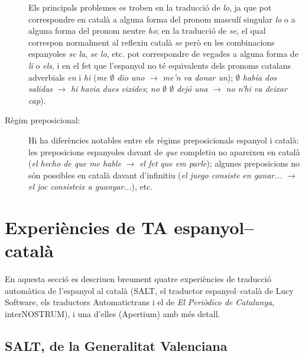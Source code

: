 \begin{description}
Els principals problemes es troben en la traducció de \emph{lo}, ja que
pot correspondre 
en català a alguna forma del pronom masculí singular {\em
  lo} o a alguna forma del
pronom neutre \emph{ho}; en la traducció de 
\emph{se}, el qual correspon normalment al reflexiu 
català \emph{se} però
en les combinacions espanyoles \emph{se la}, \emph{se lo}, etc. pot
correspondre de vegades a alguna forma de \emph{li} o \emph{els}, i en
el fet que l'espanyol no té equivalents dels pronoms catalans
adverbials \emph{en} i \emph{hi}  (\emph{me $\emptyset$ dio uno}
$\rightarrow$
\emph{me'n va donar un}); \emph{$\emptyset$ había dos salidas}
$\rightarrow$ \emph{hi havia dues eixides}; \emph{no $\emptyset$
  $\emptyset$ dejó una} $\rightarrow$ \emph{no n'hi va deixar cap}).
\item[Règim preposicional:] Hi ha diferències notables entre
  els règims preposicionals espanyol i català: les
  preposicions espanyoles davant de \emph{que} completiu no apareixen
  en català (\emph{el hecho de que me hable} $\rightarrow$ \emph{el
    fet que em parle}); algunes preposicions no són possibles en català
  davant d'infinitiu (\emph{el juego consiste en ganar...}
  $\rightarrow$ \emph{el joc consisteix a guanyar...}), etc.
\end{description}

\section{Experiències de TA espanyol--català}
\label{se:ETACC}

En aquesta secció es descriuen breument quatre experiències de
traducció automàtica de l'espanyol al català (SALT, el traductor
espanyol--català de Lucy Software, els traductors Automatictrans i el
de \textit{El Periòdico de Catalunya}, interNOSTRUM), i una d'elles
(Apertium) amb més detall.

\subsection{SALT, de la Generalitat Valenciana}


